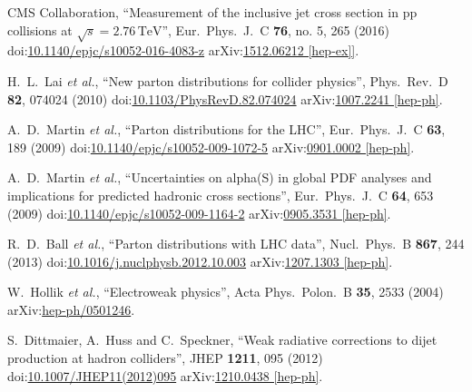 \begin{thebibliography}{99}
CMS Collaboration, ``Measurement of the inclusive jet cross section in pp collisions at $\sqrt{s} = 2.76\,\text {TeV}$'', Eur.\ Phys.\ J.\ C {\bf 76}, no. 5, 265 (2016) doi:\href{http://dx.doi.org/10.1140/epjc/s10052-016-4083-z}{10.1140/epjc/s10052-016-4083-z} arXiv:\href{https://arxiv.org/abs/1512.06212}{1512.06212 [hep-ex]]}.

H.~L.~Lai {\it et al.}, ``New parton distributions for collider physics'', Phys.\ Rev.\ D {\bf 82}, 074024 (2010) doi:\href{http://dx.doi.org/10.1103/PhysRevD.82.074024}{10.1103/PhysRevD.82.074024} arXiv:\href{https://arxiv.org/abs/1007.2241}{1007.2241 [hep-ph]}.

A.~D.~Martin {\it et al.}, ``Parton distributions for the LHC'', Eur.\ Phys.\ J.\ C {\bf 63}, 189 (2009) doi:\href{http://dx.doi.org/10.1140/epjc/s10052-009-1072-5}{10.1140/epjc/s10052-009-1072-5} arXiv:\href{https://arxiv.org/abs/0901.0002}{0901.0002 [hep-ph]}.

A.~D.~Martin {\it et al.}, ``Uncertainties on alpha(S) in global PDF analyses and implications for predicted hadronic cross sections'', Eur.\ Phys.\ J.\ C {\bf 64}, 653 (2009) doi:\href{http://dx.doi.org/10.1140/epjc/s10052-009-1164-2}{10.1140/epjc/s10052-009-1164-2} arXiv:\href{https://arxiv.org/abs/0905.3531}{0905.3531 [hep-ph]}.

R.~D.~Ball {\it et al.}, ``Parton distributions with LHC data'', Nucl.\ Phys.\ B {\bf 867}, 244 (2013) doi:\href{http://dx.doi.org/10.1016/j.nuclphysb.2012.10.003}{10.1016/j.nuclphysb.2012.10.003} arXiv:\href{https://arxiv.org/abs/1207.1303}{1207.1303 [hep-ph]}.

W.~Hollik {\it et al.}, ``Electroweak physics'', Acta Phys.\ Polon.\ B {\bf 35}, 2533 (2004) arXiv:\href{https://arxiv.org/abs/hep-ph/0501246}{hep-ph/0501246}.
 
S.~Dittmaier, A.~Huss and C.~Speckner, ``Weak radiative corrections to dijet production at hadron colliders'', JHEP {\bf 1211}, 095 (2012) doi:\href{http://dx.doi.org/10.1007/JHEP11(2012)095}{10.1007/JHEP11(2012)095} arXiv:\href{https://arxiv.org/abs/1210.0438}{1210.0438 [hep-ph]}.



\end{thebibliography}
